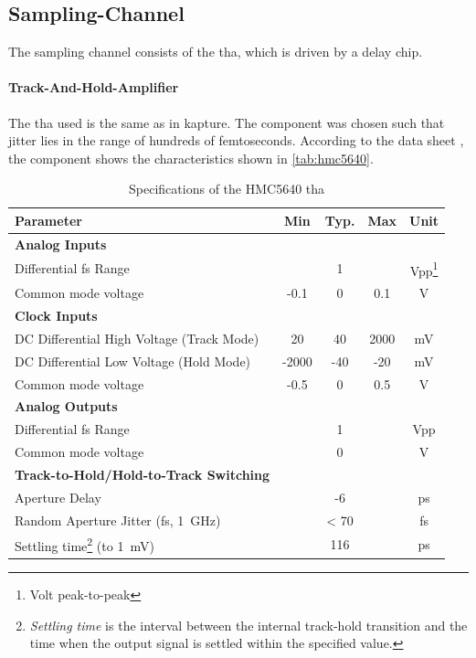 


\subsection{Sampling-Channel}
The sampling channel consists of the \gls{tha}, which is driven by a delay chip. 

\paragraph{Track-And-Hold-Amplifier}
The \gls{tha} used is the same as in \gls{kapture}. The component was chosen such that jitter lies in the range of hundreds of femtoseconds. \cite{caselle2013}
According to the data sheet \cite{hmc5640}, the component shows the characteristics shown in \autoref{tab:hmc5640}.
\begin{table}[tbh]
	\caption[HMC5640 Characteristics]{Specifications of the HMC5640 \gls{tha}}
	\label{tab:hmc5640}
	\begin{minipage}{\textwidth}
		\centering
		\begin{tabularx}{\textwidth}{Xcccc}
			\toprule
			\textbf{Parameter} & \textbf{Min} & \textbf{Typ.} & \textbf{Max} & \textbf{Unit}\\
			\midrule
			\textbf{Analog Inputs} &&&& \\
			Differential \gls{fs} Range & & 1 & & Vpp\footnote{Volt peak-to-peak}\\
			Common mode voltage & -0.1 & 0 & 0.1 & V\\[0.3cm]
			\textbf{Clock Inputs} &&&&\\
			DC Differential High Voltage (Track Mode) & 20 & 40 & 2000 & mV\\
			DC Differential Low Voltage (Hold Mode) & -2000 & -40 & -20 & mV\\
			Common mode voltage & -0.5 & 0 & 0.5 & V\\[0.3cm]
			\textbf{Analog Outputs} &&&&\\
			Differential \gls{fs} Range &  & 1 && Vpp\\
			Common mode voltage & & 0 & & V\\[0.3cm]
			\textbf{Track-to-Hold/Hold-to-Track Switching} &&&&\\
			Aperture Delay & & -6 &  & ps\\
			Random Aperture Jitter (\gls{fs}, \SI{1}{\giga \hertz}) & & < 70 & & fs\\
			Settling time\footnote{\textit{Settling time} is the interval between the internal track-hold transition and the time when the output signal is settled within the specified value.} (to \SI{1}{\milli \volt}) &	&  116 & & ps \\
			\bottomrule
		\end{tabularx}
	\end{minipage}
\end{table}

